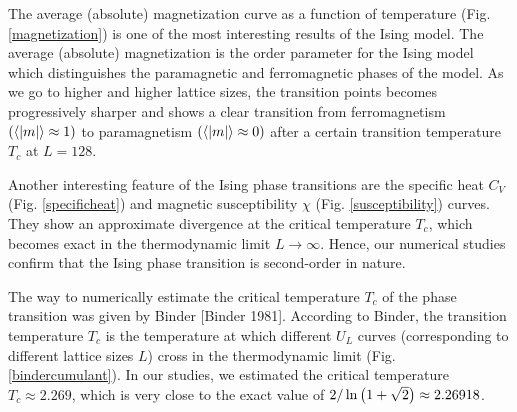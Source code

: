 \documentclass[../thesis_main.tex]{subfiles}
\begin{document}
The average (absolute) magnetization curve as a function of temperature (Fig. \ref{magnetization}) is one of the most interesting results of the Ising model. The average (absolute) magnetization is the order parameter for the Ising model which distinguishes the paramagnetic and ferromagnetic phases of the model. As we go to higher and higher lattice sizes, the transition points becomes progressively sharper and shows a clear transition from ferromagnetism $(\expval{|m|} \approx 1)$ to paramagnetism $(\expval{|m|} \approx 0)$ after a certain transition temperature $T_c$ at $L = 128$.

Another interesting feature of the Ising phase transitions are the specific heat $C_V$ (Fig. \ref{specificheat}) and magnetic susceptibility $\chi$ (Fig. \ref{susceptibility}) curves. They show an approximate divergence at the critical temperature $T_c$, which becomes exact in the thermodynamic limit $L \to \infty$. Hence, our numerical studies confirm that the Ising phase transition is second-order in nature.

The way to numerically estimate the critical temperature $T_c$ of the phase transition was given by Binder [Binder 1981]. According to Binder, the transition temperature $T_c$ is the temperature at which different $U_L$ curves (corresponding to different lattice sizes $L$) cross in the thermodynamic limit (Fig. \ref{bindercumulant}). In our studies, we estimated the critical temperature $T_c \approx 2.269$, which is very close to the exact value of $2/\ln\qty(1+\sqrt{2}) \approx 2.26918$.
\end{document}
